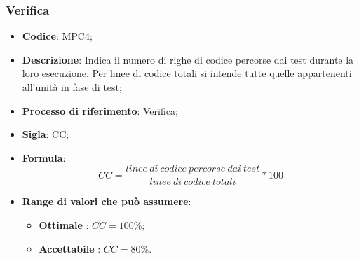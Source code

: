 \subsubsection{Verifica}
\vspace{-1cm}
\begin{itemize}
	\item \textbf{Codice}: MPC4;
	\item \textbf{Descrizione}: Indica il numero di righe di codice percorse dai test durante la loro
esecuzione. Per linee di codice totali si intende tutte quelle appartenenti all'unità in fase di test;
	\item \textbf{Processo di riferimento}: Verifica;
	\item \textbf{Sigla}: CC;
	\item \textbf{Formula}: \[ CC = \frac{linee \ di \ codice \ percorse \ dai \ test}{linee \ di \ codice \ totali} \ast 100\]
	\item \textbf{Range di valori che può assumere}: 
		\begin{itemize}
			\item \textbf{Ottimale} : $CC = 100 \%$;
			\item \textbf{Accettabile} : $CC = 80 \%$.
		\end{itemize}
\end{itemize}

